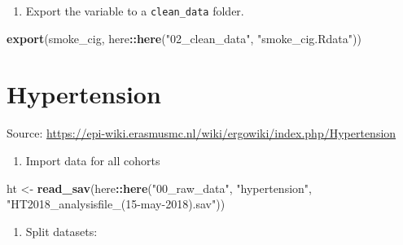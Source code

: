 \documentclass[]{book}
\newenvironment{Shaded}{\begin{snugshade}}{\end{snugshade}}
\newcommand{\CommentTok}[1]{\textcolor[rgb]{0.56,0.35,0.01}{\textit{#1}}}
\newcommand{\DecValTok}[1]{\textcolor[rgb]{0.00,0.00,0.81}{#1}}
\newcommand{\KeywordTok}[1]{\textcolor[rgb]{0.13,0.29,0.53}{\textbf{#1}}}
\newcommand{\NormalTok}[1]{#1}
\newcommand{\OperatorTok}[1]{\textcolor[rgb]{0.81,0.36,0.00}{\textbf{#1}}}
\newcommand{\StringTok}[1]{\textcolor[rgb]{0.31,0.60,0.02}{#1}}
\providecommand{\tightlist}{%
  \setlength{\itemsep}{0pt}\setlength{\parskip}{0pt}}
\begin{document}
\begin{enumerate}
\def\labelenumi{\arabic{enumi}.}
\setcounter{enumi}{6}
\tightlist
\item
  Export the variable to a \texttt{clean\_data} folder.
\end{enumerate}

\begin{Shaded}
\begin{Highlighting}[]
\KeywordTok{export}\NormalTok{(smoke_cig, here}\OperatorTok{::}\KeywordTok{here}\NormalTok{(}\StringTok{"02_clean_data"}\NormalTok{, }\StringTok{"smoke_cig.Rdata"}\NormalTok{))}
\end{Highlighting}
\end{Shaded}

\hypertarget{ht}{%
\chapter{Hypertension}\label{ht}}

Source: \url{https://epi-wiki.erasmusmc.nl/wiki/ergowiki/index.php/Hypertension}

\begin{enumerate}
\def\labelenumi{\arabic{enumi}.}
\tightlist
\item
  Import data for all cohorts
\end{enumerate}

\begin{Shaded}
\begin{Highlighting}[]
\NormalTok{ht <-}\StringTok{ }\KeywordTok{read_sav}\NormalTok{(here}\OperatorTok{::}\KeywordTok{here}\NormalTok{(}\StringTok{"00_raw_data"}\NormalTok{, }\StringTok{"hypertension"}\NormalTok{, }\StringTok{"HT2018_analysisfile_(15-may-2018).sav"}\NormalTok{))}
\end{Highlighting}
\end{Shaded}

\begin{enumerate}
\def\labelenumi{\arabic{enumi}.}
\setcounter{enumi}{1}
\tightlist
\item
  Split datasets:
\end{enumerate}

\begin{Shaded}
\end{Shaded}
\end{document}

